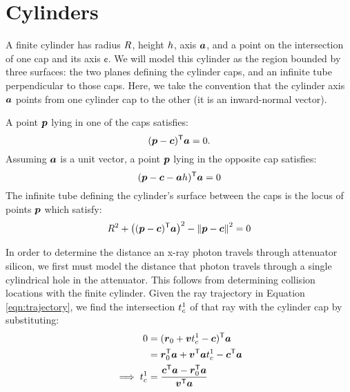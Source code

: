\documentclass[10pt,letterpaper]{article}
\begin{document}
\section{Cylinders}
A finite cylinder has radius $R$, height $h$, axis $\boldsymbol{a}$, and a point on the intersection of one cap and its axis $\cent$. We will model this cylinder as the region bounded by three surfaces: the two planes defining the cylinder caps, and an infinite tube perpendicular to those caps. Here, we take the convention that the cylinder axis $\boldsymbol{a}$ points from one cylinder cap to the other (it is an inward-normal vector). 

A point $\boldsymbol{p}$ lying in one of the caps satisfies:
	\begin{equation}
		(\boldsymbol{p} - \boldsymbol{c})^{\mathsf{T}}\boldsymbol{a} = 0.
		\label{eqn:rootcap}
	\end{equation}
Assuming $\boldsymbol{a}$ is a unit vector, a point $\boldsymbol{p}$ lying in the opposite cap satisfies:
	\begin{equation}
		(\boldsymbol{p} - \boldsymbol{c} - \boldsymbol{a}h)^{\mathsf{T}}\boldsymbol{a} = 0
		\label{eqn:endcap}
	\end{equation}	
The infinite tube defining the cylinder's surface between the caps is the locus of points $\boldsymbol{p}$ which satisfy:
	\begin{equation}
		R^2 + \big((\boldsymbol{p} - \boldsymbol{c})^{\mathsf{T}}\boldsymbol{a}\big)^2 - \left\Vert\boldsymbol{p} - \boldsymbol{c}\right\Vert^2 = 0
		\label{eqn:tube}
	\end{equation}

In order to determine the distance an x-ray photon travels through attenuator silicon, we first must model the distance that photon travels through a single cylindrical hole in the attenuator. This follows from determining collision locations with the finite cylinder. Given the ray trajectory in Equation \ref{eqn:trajectory}, we find the intersection $t_c^1$ of that ray with the cylinder cap by substituting:
	\begin{equation}
		\begin{aligned}
			0 &= (\boldsymbol{r}_0 + \boldsymbol{v} t_c^1 - \boldsymbol{c})^{\mathsf{T}}\boldsymbol{a} \\
			&= \boldsymbol{r}_0^{\mathsf{T}}\boldsymbol{a} + \boldsymbol{v}^{\mathsf{T}}\boldsymbol{a} t_c^1 - \boldsymbol{c}^{\mathsf{T}}\boldsymbol{a} \\
			\implies t_c^1 &= \frac{\boldsymbol{c}^{\mathsf{T}}\boldsymbol{a} - \boldsymbol{r}_0^{\mathsf{T}}\boldsymbol{a}}{\boldsymbol{v}^{\mathsf{T}}\boldsymbol{a}}
		\end{aligned}
	\end{equation}
\end{document}
